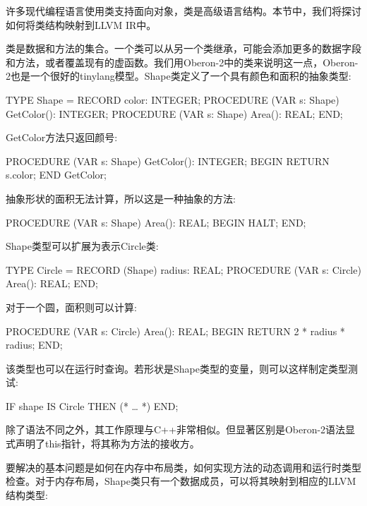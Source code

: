 
许多现代编程语言使用类支持面向对象，类是高级语言结构。本节中，我们将探讨如何将类结构映射到LLVM IR中。


类是数据和方法的集合。一个类可以从另一个类继承，可能会添加更多的数据字段和方法，或者覆盖现有的虚函数。我们用Oberon-2中的类来说明这一点，Oberon-2也是一个很好的tinylang模型。Shape类定义了一个具有颜色和面积的抽象类型:

\begin{shell}
TYPE Shape = RECORD
                color: INTEGER;
                PROCEDURE (VAR s: Shape) GetColor(): INTEGER;
                PROCEDURE (VAR s: Shape) Area(): REAL;
             END;
\end{shell}

GetColor方法只返回颜号:

\begin{shell}
PROCEDURE (VAR s: Shape) GetColor(): INTEGER;
BEGIN RETURN s.color; END GetColor;
\end{shell}

抽象形状的面积无法计算，所以这是一种抽象的方法:

\begin{shell}
PROCEDURE (VAR s: Shape) Area(): REAL;
BEGIN HALT; END;
\end{shell}

Shape类型可以扩展为表示Circle类:

\begin{shell}
TYPE Circle = RECORD (Shape)
                radius: REAL;
                PROCEDURE (VAR s: Circle) Area(): REAL;
              END;
\end{shell}

对于一个圆，面积则可以计算:

\begin{shell}
PROCEDURE (VAR s: Circle) Area(): REAL;
BEGIN RETURN 2 * radius * radius; END;
\end{shell}

该类型也可以在运行时查询。若形状是Shape类型的变量，则可以这样制定类型测试:

\begin{shell}
IF shape IS Circle THEN (* … *) END;
\end{shell}

除了语法不同之外，其工作原理与C++非常相似。但显著区别是Oberon-2语法显式声明了this指针，将其称为方法的接收方。

要解决的基本问题是如何在内存中布局类，如何实现方法的动态调用和运行时类型检查。对于内存布局，Shape类只有一个数据成员，可以将其映射到相应的LLVM结构类型:


